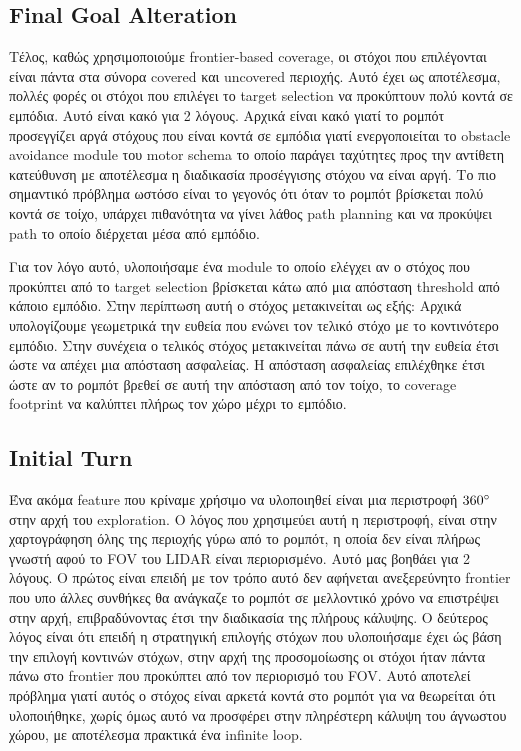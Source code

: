 \subsection*{Final Goal Alteration}

Τέλος, καθώς χρησιμοποιούμε frontier-based coverage, οι στόχοι που επιλέγονται είναι πάντα στα σύνορα covered και uncovered περιοχής. Αυτό έχει ως αποτέλεσμα, πολλές φορές οι στόχοι που επιλέγει το target selection να προκύπτουν πολύ κοντά σε εμπόδια. Αυτό είναι κακό για 2 λόγους. Αρχικά είναι κακό γιατί το ρομπότ προσεγγίζει αργά στόχους που είναι κοντά σε εμπόδια γιατί ενεργοποιείται το obstacle avoidance module του motor schema το οποίο παράγει ταχύτητες προς την αντίθετη κατεύθυνση με αποτέλεσμα η διαδικασία προσέγγισης στόχου να είναι αργή. Το πιο σημαντικό πρόβλημα ωστόσο είναι το γεγονός ότι όταν το ρομπότ βρίσκεται πολύ κοντά σε τοίχο, υπάρχει πιθανότητα να γίνει λάθος path planning και να προκύψει path το οποίο διέρχεται μέσα από εμπόδιο.

Για τον λόγο αυτό, υλοποιήσαμε ένα module το οποίο ελέγχει αν ο στόχος που προκύπτει από το target selection βρίσκεται κάτω από μια απόσταση threshold από κάποιο εμπόδιο. Στην περίπτωση αυτή ο στόχος μετακινείται ως εξής: Αρχικά υπολογίζουμε γεωμετρικά την ευθεία που ενώνει τον τελικό στόχο με το κοντινότερο εμπόδιο. Στην συνέχεια ο τελικός στόχος μετακινείται πάνω σε αυτή την ευθεία έτσι ώστε να απέχει μια απόσταση ασφαλείας. Η απόσταση ασφαλείας επιλέχθηκε έτσι ώστε αν το ρομπότ βρεθεί σε αυτή την απόσταση από τον τοίχο, το coverage footprint να καλύπτει πλήρως τον χώρο μέχρι το εμπόδιο.

\subsection*{Initial Turn}
Ένα ακόμα feature που κρίναμε χρήσιμο να υλοποιηθεί είναι μια περιστροφή $360\degree$ στην αρχή του exploration. Ο λόγος που χρησιμεύει αυτή η περιστροφή, είναι στην χαρτογράφηση όλης της περιοχής γύρω από το ρομπότ, η οποία δεν είναι πλήρως γνωστή αφού το FOV του LIDAR είναι περιορισμένο. Αυτό μας βοηθάει για 2 λόγους. Ο πρώτος είναι επειδή με τον τρόπο αυτό δεν αφήνεται ανεξερεύνητο frontier που υπο άλλες συνθήκες θα ανάγκαζε το ρομπότ σε μελλοντικό χρόνο να επιστρέψει στην αρχή, επιβραδύνοντας έτσι την διαδικασία της πλήρους κάλυψης. Ο δεύτερος λόγος είναι ότι επειδή η στρατηγική επιλογής στόχων που υλοποιήσαμε έχει ώς βάση την επιλογή κοντινών στόχων, στην αρχή της προσομοίωσης οι στόχοι ήταν πάντα πάνω στο frontier που προκύπτει από τον περιορισμό του FOV. Αυτό αποτελεί πρόβλημα γιατί αυτός ο στόχος είναι αρκετά κοντά στο ρομπότ για να θεωρείται ότι υλοποιήθηκε, χωρίς όμως αυτό να προσφέρει στην πληρέστερη κάλυψη του άγνωστου χώρου, με αποτέλεσμα πρακτικά ένα infinite loop.
